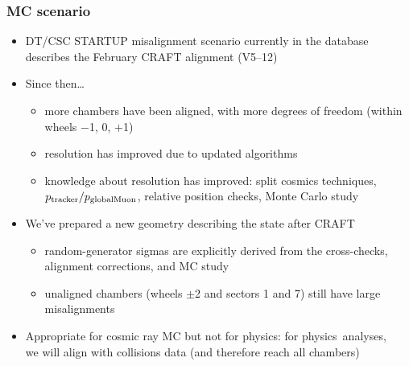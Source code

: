 \documentclass[compress]{beamer}
\begin{document}
\begin{frame}
\frametitle{MC scenario}
\begin{itemize}
\item DT/CSC STARTUP misalignment scenario currently in the database
  describes the February CRAFT alignment (V5--12)
\item Since then\ldots
\begin{itemize}
\item more chambers have been aligned, with more degrees of freedom (within wheels $-$1, 0, $+$1)
\item resolution has improved due to updated algorithms
\item knowledge about resolution has improved: split cosmics
  techniques, $p_{\mbox{\scriptsize tracker}}/p_{\mbox{\scriptsize
      globalMuon}}$, relative position checks, Monte Carlo study
\end{itemize}
\item We've prepared a new geometry describing the state after CRAFT
\begin{itemize}
\item random-generator sigmas are explicitly derived from the cross-checks, alignment corrections, and MC study
\item unaligned chambers (wheels $\pm$2 and sectors 1 and 7) still have large misalignments
\end{itemize}
\item Appropriate for cosmic ray MC but not for physics: for \mbox{physics analyses,\hspace{-1 cm}} \\ we will align with collisions data (and therefore reach all chambers)
\end{itemize}
\end{frame}


\end{document}
